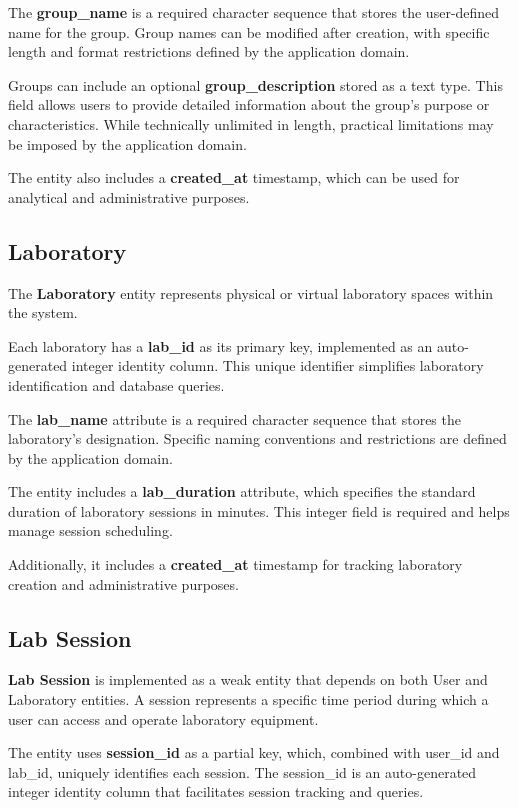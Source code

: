 \documentclass[a4paper,twoside,11pt]{article}
\begin{document}
The \textbf{group\_name} is a required character sequence that stores the user-defined name for the group. Group names can be modified after creation, with specific length and format restrictions defined by the application domain.

Groups can include an optional \textbf{group\_description} stored as a text type. This field allows users to provide detailed information about the group's purpose or characteristics. While technically unlimited in length, practical limitations may be imposed by the application domain.

The entity also includes a \textbf{created\_at} timestamp, which can be used for analytical and administrative purposes.

\subsection{Laboratory}
The \textbf{Laboratory} entity represents physical or virtual laboratory spaces within the system.

Each laboratory has a \textbf{lab\_id} as its primary key, implemented as an auto-generated integer identity column. This unique identifier simplifies laboratory identification and database queries.

The \textbf{lab\_name} attribute is a required character sequence that stores the laboratory's designation. Specific naming conventions and restrictions are defined by the application domain.

The entity includes a \textbf{lab\_duration} attribute, which specifies the standard duration of laboratory sessions in minutes. This integer field is required and helps manage session scheduling.

Additionally, it includes a \textbf{created\_at} timestamp for tracking laboratory creation and administrative purposes.

\subsection{Lab Session}
\textbf{Lab Session} is implemented as a weak entity that depends on both User and Laboratory entities. A session represents a specific time period during which a user can access and operate laboratory equipment.

The entity uses \textbf{session\_id} as a partial key, which, combined with user\_id and lab\_id, uniquely identifies each session. The session\_id is an auto-generated integer identity column that facilitates session tracking and queries.
\end{document}
